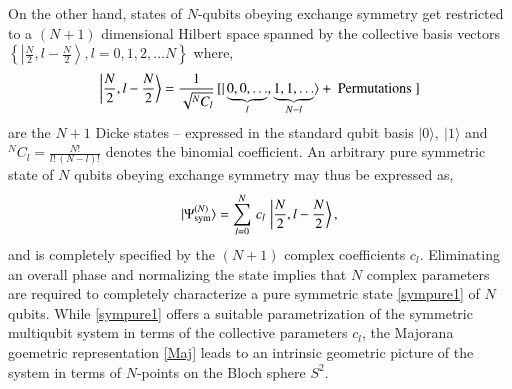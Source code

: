 On the other hand, states of $N$-qubits obeying exchange symmetry get restricted to a $(N+1)$ dimensional Hilbert space spanned by the collective basis vectors $\left\{\left\vert \frac{N}{2}, l-\frac{N}{2}\right\rangle, l=0,1,2,\ldots N \right\}$ where,
\begin{equation}
\left\vert \frac{N}{2}, l-\frac{N}{2}\right\rangle =\frac{1}{\sqrt{^N C_l}}\,[\vert \underbrace{0, 0, \ldots}_{l}, 
\underbrace{1, 1, \ldots}_{N-l}\rangle +\ {\rm Permutations}\ ] \label{Dicke} 
\end{equation}
are the $N+1$ Dicke  states -- expressed in the standard qubit basis $\vert 0\rangle,\ \vert 1\rangle$ and $^N C_l=\frac{N!}{l!\,(N-l)!}$ denotes the binomial coefficient. An arbitrary pure symmetric state of $N$ qubits obeying exchange symmetry may thus be expressed as,    
\begin{equation}
\vert \Psi^{(N)}_{\rm sym}\rangle =\sum_{l=0}^{N}\, c_l\, \left\vert \frac{N}{2}, l-\frac{N}{2}\right\rangle,\label{sympure1}
\end{equation}
and is completely specified by the $(N+1)$ complex coefficients $c_l$.  Eliminating an overall phase and normalizing  the state  implies that $N$ complex parameters are required to completely characterize a pure symmetric state \eqref{sympure1} of $N$ qubits. While \eqref{sympure1} offers a suitable parametrization of the symmetric multiqubit system in terms of the collective parameters $c_l$, the Majorana goemetric representation \eqref{Maj} leads to an intrinsic geometric picture of the  system in terms of $N$-points on the Bloch sphere $S^2$.  

